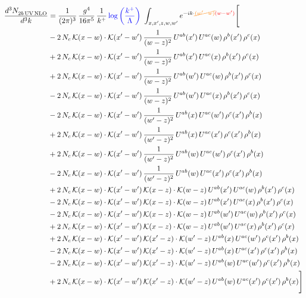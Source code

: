 \documentclass[9pt]{article}
\numberwithin{equation}{section}
\begin{document}
\begin{align}
\frac{d^{3}N_{2b\,\rm UV\, NLO}^{\rm}}{d^{3}k} & = \frac{1}{(2\pi)^{3}}\,\frac{g^{4}}{16\pi^{5}}\,\frac{1}{k^{+}}\,{\color{blue}\log{\left(\frac{k^{+}}{\Lambda}\right)}}\,\,\int_{x,x',z,w,w'}e^{-ik\cdot{\color{orange}\cancel{(w'-w)}}{\color{red}(w-w')}}\Bigg[\notag\\ & -2\,N_{c}\,\mathcal{K}(x-w)\cdot\mathcal{K}(x'-w')\,\frac{1}{(w-z)^{2}}\,U^{ab}(x')\,U^{ac}(w)\,\rho^{b}(x')\,\rho^{c}(x)\notag\\
&+2\,N_{c}\,\mathcal{K}(x-w)\cdot\mathcal{K}(x'-w')\,\frac{1}{(w-z)^{2}}\,U^{ab}(x')\,U^{ac}(x)\,\rho^{b}(x')\,\rho^{c}(x)\notag\\
&+2\,N_{c}\,\mathcal{K}(x-w)\cdot\mathcal{K}(x'-w')\,\frac{1}{(w-z)^{2}}\,U^{ab}(w')\,U^{ac}(w)\,\rho^{b}(x')\,\rho^{c}(x)\notag\\
&-2\,N_{c}\,\mathcal{K}(x-w)\cdot\mathcal{K}(x'-w')\,\frac{1}{(w-z)^{2}}\,U^{ab}(w')\,U^{ac}(x)\,\rho^{b}(x')\,\rho^{c}(x)\notag\\
&-2\,N_{c}\,\mathcal{K}(x-w)\cdot\mathcal{K}(x'-w')\,\frac{1}{(w'-z)^{2}}\,U^{ab}(x)\,U^{ac}(w')\,\rho^{c}(x')\,\rho^{b}(x)\notag\\
&+2\,N_{c}\,\mathcal{K}(x-w)\cdot\mathcal{K}(x'-w')\,\frac{1}{(w'-z)^{2}}\,U^{ab}(x)\,U^{ac}(x')\,\rho^{c}(x')\,\rho^{b}(x)\notag\\
&+2\,N_{c}\,\mathcal{K}(x-w)\cdot\mathcal{K}(x'-w')\,\frac{1}{(w'-z)^{2}}\,U^{ab}(w)\,U^{ac}(w')\,\rho^{c}(x')\,\rho^{b}(x)\notag\\
&-2\,N_{c}\,\mathcal{K}(x-w)\cdot\mathcal{K}(x'-w')\,\frac{1}{(w'-z)^{2}}\,U^{ab}(w)\,U^{ac}(x')\,\rho^{c}(x')\,\rho^{b}(x)\notag\\
&+2\,N_{c}\,\mathcal{K}(x-w)\cdot\mathcal{K}(x'-w')\,\mathcal{K}(x-z)\cdot\mathcal{K}(w-z)\,U^{ab}(x')\,U^{ac}(w)\,\rho^{b}(x')\,\rho^{c}(x)\notag\\
&-2\,N_{c}\,\mathcal{K}(x-w)\cdot\mathcal{K}(x'-w')\,\mathcal{K}(x-z)\cdot\mathcal{K}(w-z)\,U^{ab}(x')\,U^{ac}(x)\,\rho^{b}(x')\,\rho^{c}(x)\notag\\
&-2\,N_{c}\,\mathcal{K}(x-w)\cdot\mathcal{K}(x'-w')\,\mathcal{K}(x-z)\cdot\mathcal{K}(w-z)\,U^{ab}(w')\,U^{ac}(w)\,\rho^{b}(x')\,\rho^{c}(x)\notag\\
&+2\,N_{c}\,\mathcal{K}(x-w)\cdot\mathcal{K}(x'-w')\,\mathcal{K}(x-z)\cdot\mathcal{K}(w-z)\,U^{ab}(w')\,U^{ac}(x)\,\rho^{b}(x')\,\rho^{c}(x)\notag\\
&+2\,N_{c}\,\mathcal{K}(x-w)\cdot\mathcal{K}(x'-w')\,\mathcal{K}(x'-z)\cdot\mathcal{K}(w'-z)\,U^{ab}(x)\,U^{ac}(w')\,\rho^{c}(x')\,\rho^{b}(x)\notag\\
&-2\,N_{c}\,\mathcal{K}(x-w)\cdot\mathcal{K}(x'-w')\,\mathcal{K}(x'-z)\cdot\mathcal{K}(w'-z)\,U^{ab}(x)\,U^{ac}(x')\,\rho^{c}(x')\,\rho^{b}(x)\notag\\
&-2\,N_{c}\,\mathcal{K}(x-w)\cdot\mathcal{K}(x'-w')\,\mathcal{K}(x'-z)\cdot\mathcal{K}(w'-z)\,U^{ab}(w)\,U^{ac}(w')\,\rho^{c}(x')\,\rho^{b}(x)\notag\\
&+2\,N_{c}\,\mathcal{K}(x-w)\cdot\mathcal{K}(x'-w')\,\mathcal{K}(x'-z)\cdot\mathcal{K}(w'-z)\,U^{ab}(w)\,U^{ac}(x')\,\rho^{c}(x')\,\rho^{b}(x)\Bigg]
\end{align}
\end{document}
